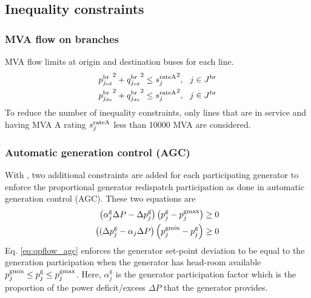 \subsection{Inequality constraints}

\subsubsection{MVA flow on branches}
MVA flow limits at origin and destination buses for each line.
\begin{align}
  {p^\text{br}_{j_{od}}}^2 + {q^\text{br}_{j_{od}}}^2 \le {s^{\text{rateA}}_j}^2,~~j \in J^\text{br}\\
  {p^\text{br}_{j_{do}}}^2 + {q^\text{br}_{j_{do}}}^2 \le {s^{\text{rateA}}_j}^2,~~j \in J^\text{br}
\end{align}
To reduce the number of inequality constraints, only lines that are in service and having MVA A rating $s^{\text{rateA}}_j$ less than 10000 MVA are considered.

\subsubsection{Automatic generation control (AGC)}
With \option{\opflowuseagc}, two additional constraints are added for each participating generator to enforce the proportional generator redispatch participation as done in automatic generation control (AGC). These two equations are 
\begin{equation}
\begin{aligned}
  \left(\alpha^{\text{g}}_j\Delta{P} - \Delta{p}^\text{g}_j\right)\left(p^\text{g}_j - p^\text{gmax}_j\right) \ge 0 \\
  \left((\Delta{p}^\text{g}_j - \alpha_j\Delta{P}\right)\left(p^\text{gmin}_j - p^\text{g}_j\right) \ge 0
\end{aligned}
\label{eq:opflow_agc}
\end{equation}
Eq. \ref{eq:opflow_agc} enforces the generator set-point deviation to be equal to the generation participation when the generator has head-room available $p^\text{gmin}_j \le p^\text{g}_j \le p^\text{gmax}_j$. Here, $\alpha^{\text{g}}_j$ is the generator participation factor which is the proportion of the power deficit/excess $\Delta{P}$ that the generator provides.

